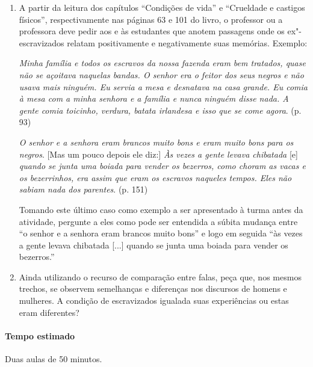 \documentclass[11pt]{extarticle}
\begin{document}
\begin{enumerate}

  \item A partir da leitura dos capítulos ``Condições de vida'' e ``Crueldade e castigos
  físicos'', respectivamente nas páginas 63 e 101 do livro, o professor ou a professora deve 
  pedir aos e às estudantes que anotem passagens onde os ex"-escravizados relatam
  positivamente e negativamente suas memórias. Exemplo:

\vspace{5mm}

\emph{Minha família e todos os escravos da nossa fazenda eram
bem tratados, quase não se açoitava naquelas bandas. O
senhor era o feitor dos seus negros e não usava mais
ninguém. Eu servia a mesa e desnatava na casa grande.
Eu comia à mesa com a minha senhora e a família
e nunca ninguém disse nada. A gente comia toicinho,
verdura, batata irlandesa e isso que se come agora}. (p. 93)

\vspace{3mm}

\emph{O senhor e a senhora
eram brancos muito bons e eram muito bons para os negros}. [Mas um pouco depois ele diz:] \emph{Às vezes a gente
levava chibatada} [e] \emph{quando se junta uma boiada para
vender os bezerros, como choram as vacas e os bezerrinhos, era assim que eram os escravos naqueles tempos.
Eles não sabiam nada dos parentes}. (p. 151)

\vspace{5mm}

Tomando este último caso como exemplo a ser apresentado à turma antes da atividade,
pergunte a eles como pode ser entendida a súbita mudança entre ``o senhor
e a senhora eram brancos muito bons'' e logo em seguida ``às vezes a gente 
levava chibatada [...] quando se junta uma boiada para
vender os bezerros.''

  \item
  Ainda utilizando o recurso de comparação entre falas, peça que,
  nos mesmos trechos, se observem semelhanças e diferenças
  nos discursos de homens e mulheres. A condição de escravizados
  igualada suas experiências ou estas eram diferentes?

\end{enumerate}

  \paragraph{Tempo estimado} Duas aulas de 50 minutos.
\end{document}
